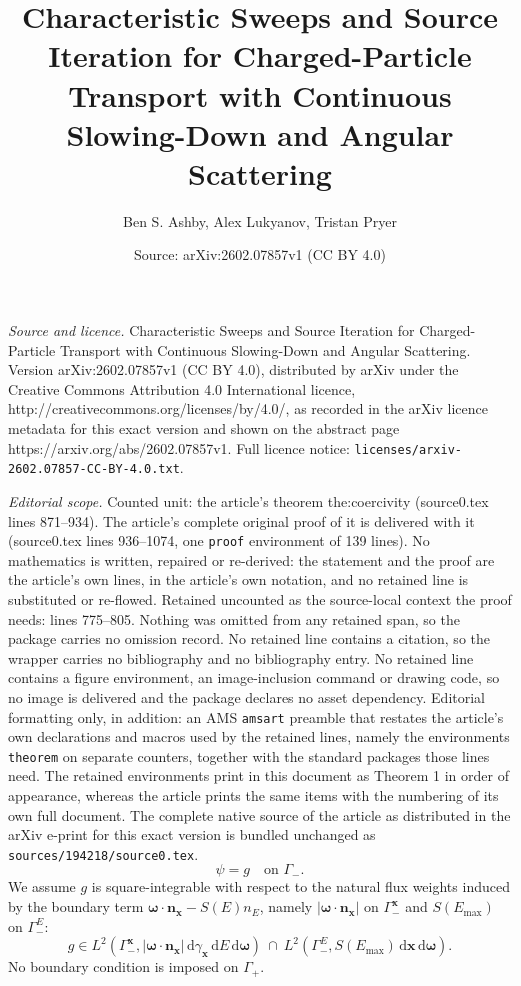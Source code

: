 \documentclass[10pt,a4paper]{amsart}
\title{Characteristic Sweeps and Source Iteration for Charged-Particle Transport with Continuous Slowing-Down and Angular Scattering}
\author{Ben S. Ashby, Alex Lukyanov, Tristan Pryer}
\date{Source: arXiv:2602.07857v1 (CC BY 4.0)}
\renewcommand{\d}{\ensuremath{\,\mathrm{d}}}
\renewcommand{\vec}[1]{\ensuremath{\boldsymbol{#1}}}
\begin{document}
\maketitle

\noindent\emph{Source and licence.} Characteristic Sweeps and Source Iteration for Charged-Particle Transport with Continuous Slowing-Down and Angular Scattering. Version arXiv:2602.07857v1 (CC BY 4.0), distributed by arXiv under the Creative Commons Attribution 4.0 International licence, http://creativecommons.org/licenses/by/4.0/, as recorded in the arXiv licence metadata for this exact version and shown on the abstract page https://arxiv.org/abs/2602.07857v1. Full licence notice: \texttt{licenses/arxiv-2602.07857-CC-BY-4.0.txt}.\par\smallskip

\noindent\textit{Editorial scope.} Counted unit: the article's theorem the:coercivity (source0.tex lines 871--934). The article's complete original proof of it is delivered with it (source0.tex lines 936--1074, one \texttt{proof} environment of 139 lines). No mathematics is written, repaired or re-derived: the statement and the proof are the article's own lines, in the article's own notation, and no retained line is substituted or re-flowed.  Retained uncounted as the source-local context the proof needs: lines 775--805.  Nothing was omitted from any retained span, so the package carries no omission record.  No retained line contains a citation, so the wrapper carries no bibliography and no bibliography entry.  No retained line contains a figure environment, an image-inclusion command or drawing code, so no image is delivered and the package declares no asset dependency.  Editorial formatting only, in addition: an AMS \texttt{amsart} preamble that restates the article's own declarations and macros used by the retained lines, namely the environments \texttt{theorem} on separate counters, together with the standard packages those lines need.  The retained environments print in this document as Theorem 1 in order of appearance, whereas the article prints the same items with the numbering of its own full document.  The complete native source of the article as distributed in the arXiv e-print for this exact version is bundled unchanged as \texttt{sources/194218/source0.tex}.
\begin{equation}\label{eq:inflowBC}
  \psi = g \quad \text{on }\Gamma_-.
\end{equation}
We assume $g$ is square-integrable with respect to the natural flux
weights induced by the boundary term $\vec\omega\cdot\vec n_{\vec x}-S(E)n_E$,
namely $|\vec\omega\cdot\vec n_{\vec x}|$ on $\Gamma_-^{\vec x}$ and
$S(E_{\max})$ on $\Gamma_-^{E}$:
\[
  g\in L^2(\Gamma_-^{\vec x}, |\vec\omega\cdot \vec n_{\vec x}| \d\gamma_{\vec x} \d E \d\vec\omega)
  \ \cap\
  L^2(\Gamma_-^{E}, S(E_{\max}) \d\vec x \d\vec\omega).
\]
No boundary condition is imposed on $\Gamma_+$.
\end{document}
